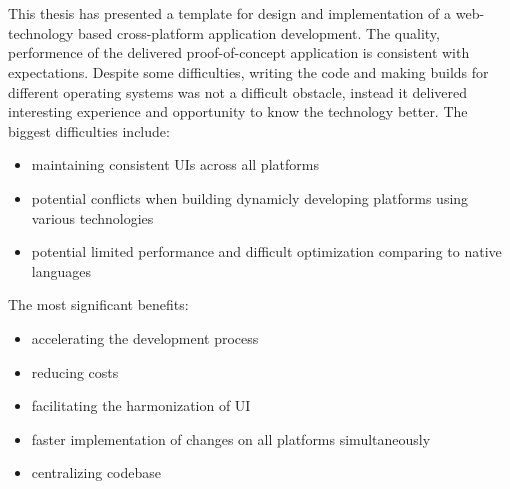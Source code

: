 
\chapter{}%
\label{ch:conclusie}


This thesis has presented a template for design and implementation of a web-technology based cross-platform application development. The quality, performence of the delivered proof-of-concept application is consistent with expectations. 
Despite some difficulties, writing the code and making builds for different operating systems was not a difficult obstacle, instead it delivered interesting experience and opportunity to know the technology better.
\newline
The biggest difficulties include:
\begin{itemize}
    \item maintaining consistent UIs across all platforms
    \item potential conflicts when building dynamicly developing platforms using various technologies
    \item potential limited performance and difficult optimization comparing to native languages
\end{itemize}

The most significant benefits:
\begin{itemize}
    \item accelerating the development process
    \item reducing costs
    \item facilitating the harmonization of UI
    \item faster implementation of changes on all platforms simultaneously
    \item centralizing codebase
\end{itemize}

